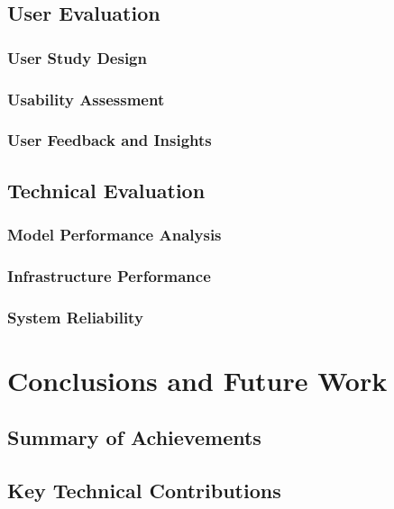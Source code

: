 \documentclass[conference]{IEEEtran}
\begin{document}
\subsection{User Evaluation}

\subsubsection{User Study Design}

\subsubsection{Usability Assessment}

\subsubsection{User Feedback and Insights}

\subsection{Technical Evaluation}

\subsubsection{Model Performance Analysis}

\subsubsection{Infrastructure Performance}

\subsubsection{System Reliability}

\section{Conclusions and Future Work}

\subsection{Summary of Achievements}

\subsection{Key Technical Contributions}
\end{document}
